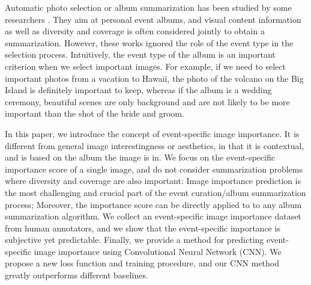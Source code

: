 \documentclass[10pt,twocolumn,letterpaper]{article}
\begin{document}




Automatic photo selection or album summarization has been studied by some researchers \cite{nips_summarize, vacation, sum_pinaki, photo_selection1, gaze}. They aim at personal event albums, and visual content information as well as diversity and coverage is often considered jointly to obtain a summarization. 
However, these works ignored the role of the event type in the selection process. Intuitively, the event type of the album is an important criterion when we select important images. For example, if we need to select important photos from a vacation to Hawaii, the photo of the volcano on the Big Island is definitely important to keep, whereas if the album is a wedding ceremony, beautiful scenes are only background and are not likely to be more important than the shot of the bride and groom. 

In this paper, we introduce the concept of event-specific image importance. It is different from general image interestingness or aesthetics, in that it is contextual, and is based on the album the image is in. We focus on the event-specific importance score of a single image, and do not consider summarization problems where diversity and coverage are also important: Image importance prediction is the most challenging and crucial part of the event curation/album summarization process; Moreover, the importance score can be directly applied to to any album summarization algorithm. 
We collect an event-specific image importance dataset from human annotators, and we show that the event-specific importance is subjective yet predictable. Finally, we provide a method for predicting event-specific image importance using Convolutional Neural Network (CNN). We propose a new loss function and training procedure, and our CNN method greatly outperforms different baselines.
\end{document}
